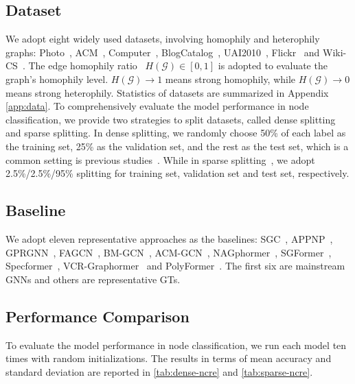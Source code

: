 

% 

\subsection{Dataset}
We adopt eight widely used datasets, involving homophily and heterophily graphs: 
Photo~\cite{nagphormer}, ACM~\cite{acm}, Computer~\cite{nagphormer}, BlogCatalog~\cite{socialnets}, UAI2010~\cite{amgcn}, Flickr~\cite{socialnets} and Wiki-CS~\cite{roman}.
The edge homophily ratio~\cite{glognn} ${H}(\mathcal{G})\in[0,1]$ is adopted to evaluate the graph's homophily level. 
${H}(\mathcal{G}) \rightarrow 1$ means strong homophily, 
while ${H}(\mathcal{G}) \rightarrow 0$ means strong heterophily.
Statistics of datasets are summarized in Appendix \ref{app:data}.
To comprehensively evaluate the model performance in node classification, we provide two strategies to split datasets, called dense splitting and sparse splitting.
In dense splitting, we randomly choose 50\% of each label as the training set, 25\% as the validation set, and the rest as the test set, which is a common setting is previous studies~\cite{nodeformer,sgformer}.
While in sparse splitting~\cite{gprgnn}, we adopt 2.5\%/2.5\%/95\% splitting for training set, validation set and test set, respectively.


\subsection{Baseline}
We adopt eleven representative approaches as the baselines: SGC~\cite{sgc}, APPNP~\cite{appnp}, GPRGNN~\cite{gprgnn}, FAGCN~\cite{fagcn}, BM-GCN~\cite{bmgcn}, ACM-GCN~\cite{acmgnn}, NAGphormer~\cite{nagphormer}, SGFormer~\cite{sgformer}, Specformer~\cite{specformer}, VCR-Graphormer~\cite{vcrgt} and PolyFormer~\cite{polyformer}.
The first six are mainstream GNNs and others are representative GTs.





% 


\subsection{Performance Comparison}
To evaluate the model performance in node classification, we run each model ten times with random initializations. The results in terms of mean accuracy and standard deviation are reported in \autoref{tab:dense-ncre} and \autoref{tab:sparse-ncre}.

